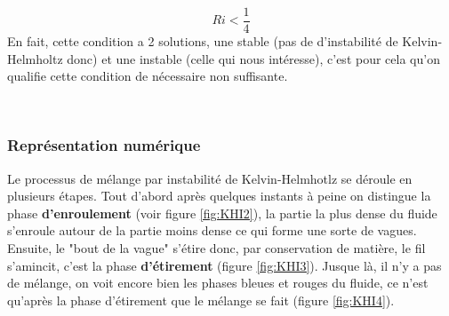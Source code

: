 \documentclass{rapportECC}
\begin{document}
\begin{equation}
    Ri < \frac{1}{4}
\end{equation}
En fait, cette condition a 2 solutions, une stable (pas de d'instabilité de Kelvin-Helmholtz donc) et une instable (celle qui nous intéresse), c'est pour cela qu'on qualifie cette condition de nécessaire non suffisante.

 \\

\subsubsection{Représentation numérique}
Le processus de mélange par instabilité de Kelvin-Helmhotlz se déroule en plusieurs étapes. Tout d'abord après quelques instants à peine on distingue la phase \textbf{d'enroulement} (voir figure \ref{fig:KHI2}), la partie la plus dense du fluide s'enroule autour de la partie moins dense ce qui forme une sorte de vagues. Ensuite, le "bout de la vague" s'étire donc, par conservation de matière, le fil s'amincit, c'est la phase \textbf{d'étirement} (figure \ref{fig:KHI3}). Jusque là, il n'y a pas de mélange, on voit encore bien les phases bleues et rouges du fluide, ce n'est qu'après la phase d'étirement que le mélange se fait (figure \ref{fig:KHI4}).
\end{document}
